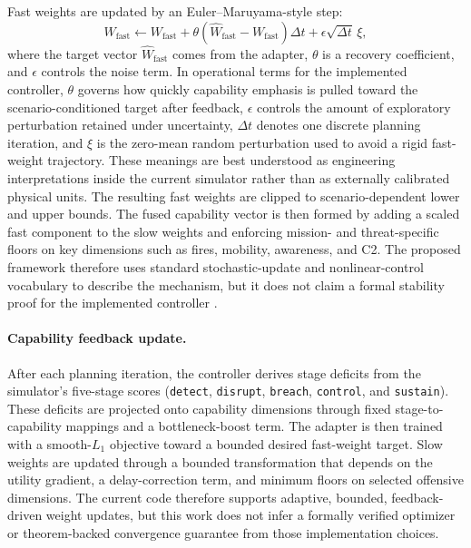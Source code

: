 Fast weights are updated by an Euler--Maruyama-style step:
\[
W_{\text{fast}} \leftarrow W_{\text{fast}} + \theta(\hat{W}_{\text{fast}} - W_{\text{fast}})\Delta t + \epsilon \sqrt{\Delta t}\,\xi,
\]
where the target vector $\hat{W}_{\text{fast}}$ comes from the adapter, $\theta$ is a recovery coefficient, and $\epsilon$ controls the noise term. In operational terms for the implemented controller, $\theta$ governs how quickly capability emphasis is pulled toward the scenario-conditioned target after feedback, $\epsilon$ controls the amount of exploratory perturbation retained under uncertainty, $\Delta t$ denotes one discrete planning iteration, and $\xi$ is the zero-mean random perturbation used to avoid a rigid fast-weight trajectory. These meanings are best understood as engineering interpretations inside the current simulator rather than as externally calibrated physical units. The resulting fast weights are clipped to scenario-dependent lower and upper bounds. The fused capability vector is then formed by adding a scaled fast component to the slow weights and enforcing mission- and threat-specific floors on key dimensions such as fires, mobility, awareness, and C2. The proposed framework therefore uses standard stochastic-update and nonlinear-control vocabulary to describe the mechanism, but it does not claim a formal stability proof for the implemented controller \citep{mao2007sde,khalil2002nonlinear}.

\paragraph{Capability feedback update.}
After each planning iteration, the controller derives stage deficits from the simulator's five-stage scores (\texttt{detect}, \texttt{disrupt}, \texttt{breach}, \texttt{control}, and \texttt{sustain}). These deficits are projected onto capability dimensions through fixed stage-to-capability mappings and a bottleneck-boost term. The adapter is then trained with a smooth-$L_1$ objective toward a bounded desired fast-weight target. Slow weights are updated through a bounded transformation that depends on the utility gradient, a delay-correction term, and minimum floors on selected offensive dimensions. The current code therefore supports adaptive, bounded, feedback-driven weight updates, but this work does not infer a formally verified optimizer or theorem-backed convergence guarantee from those implementation choices.

